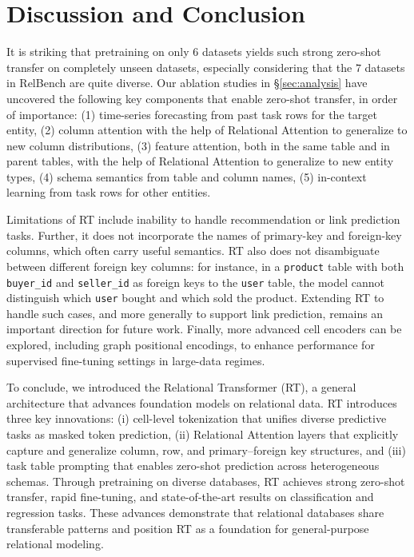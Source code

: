 \section{Discussion and Conclusion}
\label{sec:conclusion}
It is striking that pretraining on only $6$ datasets
yields such strong zero-shot transfer on completely unseen datasets,
especially considering that the $7$ datasets in RelBench
are quite diverse.
Our ablation studies in \S \ref{sec:analysis}
have uncovered the following key components that
enable zero-shot transfer, in order of importance:
(1) time-series forecasting from past task rows for the target entity,
(2) column attention with the help of Relational Attention to generalize to new column distributions,
(3) feature attention, both in the same table and in parent tables,
with the help of Relational Attention to generalize to new entity types,
(4) schema semantics from table and column names,
(5) in-context learning from task rows for other entities.

Limitations of RT include inability to handle recommendation or link prediction tasks. Further, it does not incorporate the names of primary-key and foreign-key columns, which often carry useful semantics. RT also does not disambiguate between different foreign key columns: for instance, in a \texttt{product} table with both \texttt{buyer\_id} and \texttt{seller\_id} as foreign keys to the \texttt{user} table, the model cannot distinguish which \texttt{user} bought and which sold the product. Extending RT to handle such cases, and more generally to support link prediction, remains an important direction for future work. Finally, more advanced cell encoders can be explored, including graph positional encodings, to enhance performance for supervised fine-tuning settings in large-data regimes.

To conclude, we introduced the Relational Transformer (RT), a general architecture that advances foundation models on relational data. RT introduces three key innovations: (i) cell-level tokenization that unifies diverse predictive tasks as masked token prediction, (ii) Relational Attention layers that explicitly capture and generalize column, row, and primary–foreign key structures, and (iii) task table prompting that enables zero-shot prediction across heterogeneous schemas. Through pretraining on diverse databases, RT achieves strong zero-shot transfer, rapid fine-tuning, and state-of-the-art results on classification and regression tasks. These advances demonstrate that relational databases share transferable patterns and position RT as a foundation for general-purpose relational modeling.

